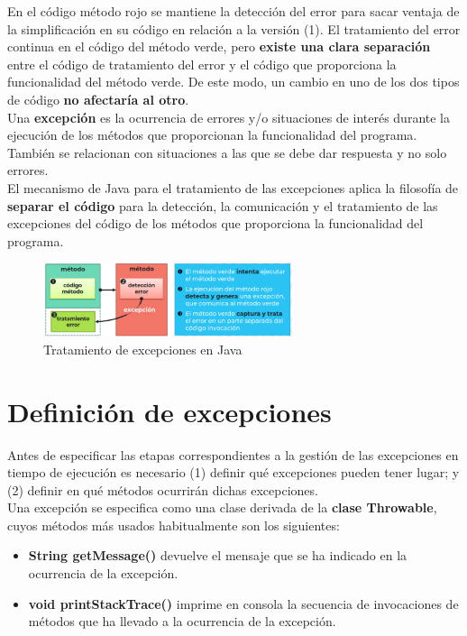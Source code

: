 \documentclass{article}
\begin{document}
En el código método rojo se mantiene la detección del error para sacar ventaja de la simplificación en su código en relación a la versión (1).
El tratamiento del error continua en el código del método verde, pero \textbf{existe una clara separación} entre el código de tratamiento del error y el código que proporciona la funcionalidad del método verde. De este modo, un cambio en uno de los dos tipos de código \textbf{no afectaría al otro}. \\

Una \textbf{excepción} es la ocurrencia de errores y/o situaciones de interés durante la ejecución de los métodos que proporcionan la funcionalidad del programa. También se relacionan con situaciones a las que se debe dar respuesta y no solo errores. \\

El mecanismo de Java para el tratamiento de las excepciones aplica la filosofía de \textbf{separar el código} para la detección, la comunicación y el tratamiento de las excepciones del código de los métodos que proporciona la funcionalidad del programa.

\begin{figure}[h]
    \centering
    \includegraphics[width=0.65\textwidth]{img-t7/img_793_12.png}
    \caption{Tratamiento de excepciones en Java}
\end{figure}

\section{Definición de excepciones}
Antes de especificar las etapas correspondientes a la gestión de las excepciones en tiempo de ejecución es necesario (1) definir qué excepciones pueden tener lugar; y (2) definir en
qué métodos ocurrirán dichas excepciones. \\

Una excepción se especifica como una clase derivada de la \textbf{clase Throwable}, cuyos métodos más usados habitualmente son los siguientes: 
\begin{itemize}
    \item \textbf{String getMessage()} devuelve el mensaje que se ha indicado en la ocurrencia de la excepción.
    \item \textbf{void printStackTrace()} imprime en consola la secuencia de invocaciones de métodos que ha llevado a la ocurrencia de la excepción.
\end{itemize}
\end{document}
